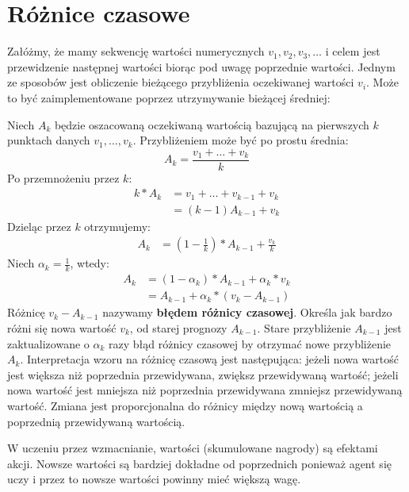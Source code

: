 \documentclass[a4paper, 12pt,twoside]{report}
\begin{document}
\section{Różnice czasowe}
Załóżmy, że mamy sekwencję wartości numerycznych $v_1,v_2,v_3,\dots$ i celem
jest przewidzenie następnej wartości biorąc pod uwagę poprzednie wartości.
Jednym ze sposobów jest obliczenie bieżącego przybliżenia oczekiwanej wartości
$v_i$. Może to być zaimplementowane poprzez utrzymywanie bieżącej średniej:

Niech $A_k$ będzie oszacowaną oczekiwaną wartością bazującą na pierwszych $k$
punktach danych $v_1, \dots, v_k$. Przybliżeniem może być po prostu średnia:
\[A_k = \frac{v_1 + \dots + v_k}{k}\]
Po przemnożeniu przez $k$:
\begin{equation} \label{td_1}
\begin{split}
	k * A_k &= v_1 + \dots + v_{k-1} + v_k \\
	        &= (k-1)A_{k-1} + v_k
\end{split}
\end{equation}
Dzieląc przez $k$ otrzymujemy:
\begin{equation} \label{td_2}
\begin{split}
	A_k &= \left( 1 - \frac{1}{k} \right) * A_{k-1} + \frac{v_k}{k}
\end{split}
\end{equation}
Niech $\alpha_k = \frac{1}{k}$, wtedy:
\begin{equation} \label{td_3}
\begin{split}
	A_k &= (1 - \alpha_k) * A_{k-1} + \alpha_k * v_k \\
	    &= A_{k-1} + \alpha_k * (v_k - A_{k-1})
\end{split}
\end{equation}
Różnicę $v_k - A_{k-1}$ nazywamy \textbf{błędem różnicy czasowej}. Określa jak
bardzo różni się nowa wartość $v_k$, od starej prognozy $A_{k-1}$. Stare
przybliżenie $A_{k-1}$ jest zaktualizowane o $\alpha_k$ razy błąd różnicy
czasowej by otrzymać nowe przybliżenie $A_k$. Interpretacja wzoru na różnicę
czasową jest następująca: jeżeli nowa wartość jest większa niż poprzednia
przewidywana,
zwiększ przewidywaną wartość; jeżeli nowa wartość jest mniejsza niż poprzednia
przewidywana zmniejsz przewidywaną wartość. Zmiana jest proporcjonalna do
różnicy między nową wartością a poprzednią przewidywaną wartością.

W uczeniu przez wzmacnianie, wartości (skumulowane nagrody) są efektami akcji.
Nowsze wartości są bardziej dokładne od poprzednich ponieważ agent się uczy i
przez to nowsze wartości powinny mieć większą wagę.
\end{document}
